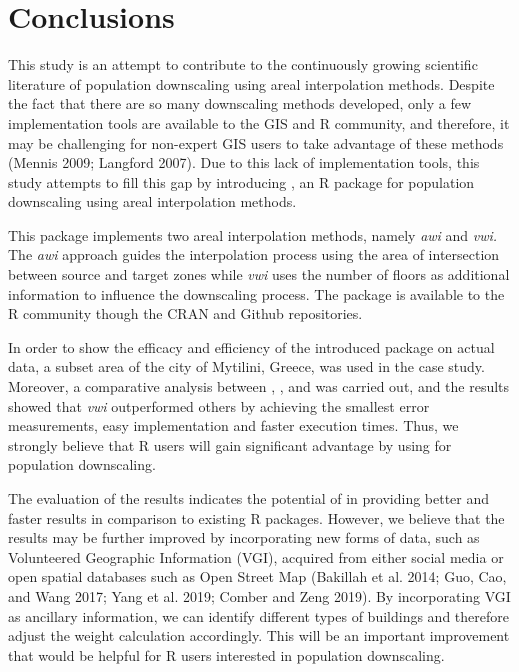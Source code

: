 \hypertarget{conclusions}{%
\section{Conclusions}\label{conclusions}}

This study is an attempt to contribute to the continuously growing scientific literature of population
downscaling using areal interpolation methods. Despite the fact that there are so many downscaling
methods developed, only a few implementation tools are available to the GIS and R community, and
therefore, it may be challenging for non-expert GIS users to take advantage of these methods (Mennis 2009; Langford 2007). Due to this lack of implementation tools, this study attempts to fill this gap
by introducing , an R package for population downscaling using areal interpolation methods.

This package implements two areal interpolation methods, namely \emph{awi} and \emph{vwi.} The \emph{awi} approach
guides the interpolation process using the area of intersection between source and target zones while
\emph{vwi} uses the number of floors as additional information to influence the downscaling process. The
package is available to the R community though the CRAN and Github repositories.

In order to show the efficacy and efficiency of the introduced package on actual data, a subset
area of the city of Mytilini, Greece, was used in the case study. Moreover, a comparative analysis
between , , and  was carried out, and the results showed that \emph{vwi} outperformed others by achieving the smallest error measurements, easy implementation and faster execution times. Thus,
we strongly believe that R users will gain significant advantage by using  for population
downscaling.

The evaluation of the results indicates the potential of  in providing better and faster results
in comparison to existing R packages. However, we believe that the results may be further improved
by incorporating new forms of data, such as Volunteered Geographic Information (VGI), acquired
from either social media or open spatial databases such as Open Street Map (Bakillah et al. 2014; Guo, Cao, and Wang 2017; Yang et al. 2019; Comber and Zeng 2019). By incorporating VGI as ancillary information, we can identify different types of buildings and therefore adjust the weight calculation accordingly. This will be an important improvement that would be helpful for R users interested in population
downscaling.


